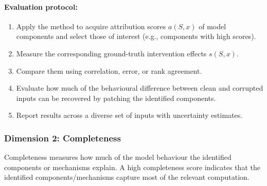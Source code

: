 \paragraph{Evaluation protocol:}
\begin{enumerate}
\item Apply the method to acquire attribution scores \(a(S,x)\) of model components and select those of interest (e.g., components with high scores).
\item Measure the corresponding ground-truth intervention effects \(s(S,x)\).
\item Compare them using correlation, error, or rank agreement.
\item Evaluate how much of the behavioural difference between clean and corrupted inputs can be recovered by patching the identified components.
\item Report results across a diverse set of inputs with uncertainty estimates.
\end{enumerate}

\subsubsection*{Dimension 2: Completeness}

Completeness measures how much of the model behaviour the identified components or mechanisms explain. A high completeness score indicates that the identified components/mechanisms capture most of the relevant computation.

